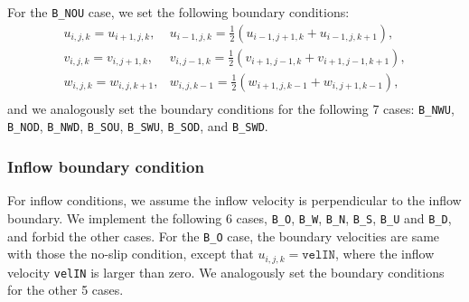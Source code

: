 \documentclass[a4paper, 12pt]{article}
\begin{document}
For the \texttt{B\_NOU} case, we set the following boundary conditions:
\begin{equation}
\begin{array}{ll}
u_{i,j,k} = u_{i+1,j,k}, & u_{i-1,j,k} = \frac{1}{2}(u_{i-1,j+1,k}+u_{i-1,j,k+1}), \\
v_{i,j,k} = v_{i,j+1,k}, & v_{i,j-1,k} = \frac{1}{2}(v_{i+1,j-1,k}+v_{i+1,j-1,k+1}), \\
w_{i,j,k} = w_{i,j,k+1}, & w_{i,j,k-1} = \frac{1}{2}(w_{i+1,j,k-1}+w_{i,j+1,k-1}), \\
\end{array}
\end{equation}
and we analogously set the boundary conditions for the following 7 cases: \texttt{B\_NWU}, \texttt{B\_NOD}, \texttt{B\_NWD}, \texttt{B\_SOU}, \texttt{B\_SWU}, \texttt{B\_SOD}, and \texttt{B\_SWD}.

\subsubsection{Inflow boundary condition}\label{sec:inflow}
For inflow conditions, we assume the inflow velocity is perpendicular to the inflow boundary. We implement the following 6 cases, \texttt{B\_O}, \texttt{B\_W}, \texttt{B\_N}, \texttt{B\_S}, \texttt{B\_U} and \texttt{B\_D}, and forbid the other cases.
For the \texttt{B\_O} case, the boundary velocities are same with those the no-slip condition, except that $u_{i,j,k} = \texttt{velIN}$, where the inflow velocity \texttt{velIN} is larger than zero. We analogously set the boundary conditions for the other 5 cases.

%
%
\end{document}
